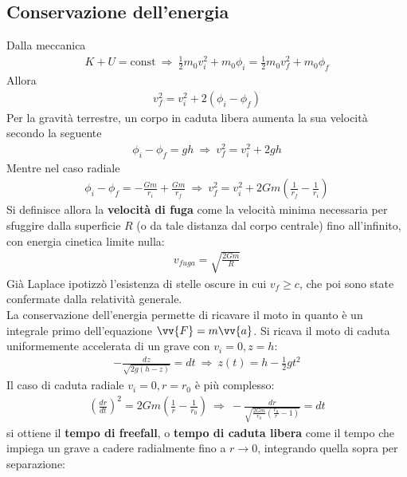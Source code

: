 \documentclass[a4paper, oneside]{book}
\begin{document}
\subsection{Conservazione dell'energia}
Dalla meccanica
\begin{align}
    K + U = \text{const} \ \Longrightarrow \ \frac{1}{2}m_0v_i^{2} + m_0\phi_i = \frac{1}{2}m_0v_f^{2} + m_0\phi_f
\end{align}
Allora 
\begin{align}
    v_f^{2} = v_i^{2} + 2(\phi_i - \phi_f)
\end{align}
Per la gravità terrestre, un corpo in caduta libera aumenta la sua velocità secondo la seguente
\begin{gather*}
    \phi_i - \phi_f = gh \ \Longrightarrow \ v_f^{2} = v_i^{2} + 2gh
\end{gather*}
Mentre nel caso radiale
\begin{gather*}
    \phi_i - \phi_f = -\frac{Gm}{r_i} + \frac{Gm}{r_f} \ \Longrightarrow \ v_f^{2} = v_i^{2} + 2Gm\left(\frac{1}{r_f} - \frac{1}{r_i}\right)
\end{gather*}
Si definisce allora la \textbf{velocità di fuga} come la velocità minima necessaria 
per sfuggire dalla superficie $R$ (o da tale distanza dal corpo centrale) 
fino all'infinito, con energia cinetica limite nulla: 
\begin{align}
    v_{fuga} = \sqrt{\frac{2Gm}{R}} 
\end{align}
Già Laplace ipotizzò l'esistenza di stelle oscure in cui $v_{f} \geq c$, che 
poi sono state confermate dalla relatività generale. \\
La conservazione dell'energia permette di ricavare il moto in quanto
è un integrale primo dell'equazione $\vv{F}= m\vv{a}$.
Si ricava il moto di caduta uniformemente accelerata di un grave con $v_i = 0, z = h$:
\begin{gather*}
    - \frac{dz}{\sqrt{2g(h - z)} } = dt \ \Longrightarrow \ z(t) = h - \frac{1}{2}gt^{2}
\end{gather*}
Il caso di caduta radiale $v_i = 0, r = r_0$ è più complesso:
\begin{gather*}
    \left(\frac{dr}{dt}\right)^{2} = 2Gm\left(\frac{1}{r} - \frac{1}{r_0}\right) \ \Longrightarrow \ -\frac{dr}{\sqrt{\frac{2Gm}{r_0} \left(\frac{r_0}{r} - 1\right)} } = dt
\end{gather*}
si ottiene il \textbf{tempo di freefall}, o \textbf{tempo di caduta libera} come
il tempo che impiega un grave a cadere radialmente fino a $r \to 0$, integrando quella sopra per separazione:
\end{document}
